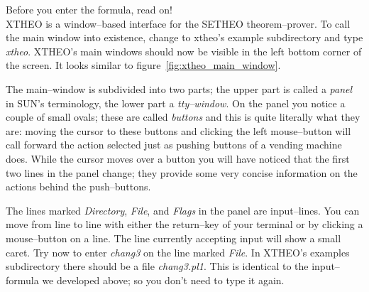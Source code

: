 Before you enter the formula, read on!
\\
XTHEO is a window--based interface for the SETHEO theorem--prover. To call the main window into existence,
change to xtheo's example subdirectory and type {\it xtheo\/}. XTHEO's main windows should now be visible
in the left bottom corner of the screen. It looks similar to figure~\ref{fig:xtheo_main_window}.
%


The main--window is subdivided into two parts; the upper part is called a {\it panel\/} in SUN's terminology,
the lower part a {\it tty--window\/}. On the panel you notice a couple of small ovals; these are called
{\it buttons\/} and this is quite literally what they are: moving the cursor to these buttons and clicking
the left mouse--button will call forward the action selected just as pushing buttons of a vending
machine does. 
While the cursor moves over a button you will have noticed that the first two lines in the panel change;
they provide some very concise information on the actions behind the push--buttons.

The lines marked {\it Directory\/}, {\it File\/}, and {\it Flags\/} in the panel are input--lines.
You can move from line to line with either the return--key of your terminal or by clicking a
mouse--button on a line. The line currently accepting input will show a small caret. 
Try now to enter {\it chang3\/} on the line marked {\it File\/}.
In XTHEO's examples subdirectory there should be a file {\it chang3.pl1\/}. This is identical to
the input--formula we developed above; so you don't need to type it again.

